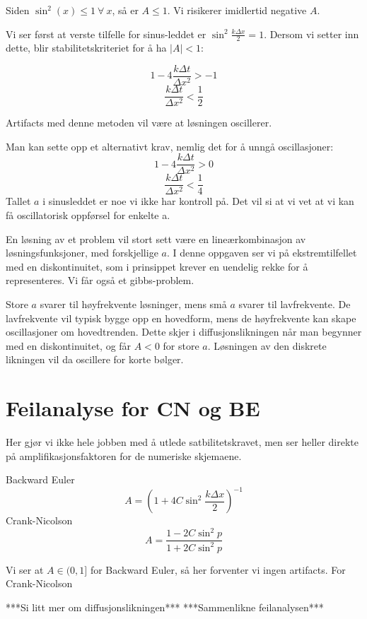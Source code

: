 \documentclass[a4paper, 10pt]{article}
\begin{document}
Siden $\sin^2(x) \leq 1 \ \forall \ x$, så er $A \leq 1$. Vi risikerer imidlertid negative $A$. 

Vi ser først at verste tilfelle for sinus-leddet er $\sin^2{\frac{k\Delta x}{2}} = 1$. Dersom vi setter inn dette, blir stabilitetskriteriet for å ha $|A| < 1$:

\begin{equation}
	1 - 4\frac{k\Delta t}{\Delta x^2} > -1
\end{equation}
\begin{equation}
	\frac{k\Delta t}{\Delta x^2} < \frac{1}{2}
\end{equation}

Artifacts med denne metoden vil være at løsningen oscillerer.

Man kan sette opp et alternativt krav, nemlig det for å unngå oscillasjoner: 
\begin{equation}
	1 - 4\frac{k \Delta t}{\Delta x^2} > 0 
\end{equation}
\begin{equation}
	\frac{k\Delta t}{\Delta x^2} < \frac{1}{4}
\end{equation}
Tallet $a$ i sinusleddet er noe vi ikke har kontroll på. Det vil si at vi vet at vi kan få oscillatorisk oppførsel for enkelte a. 

En løsning av et problem vil stort sett være en lineærkombinasjon av løsningsfunksjoner, med forskjellige $a$. I denne oppgaven ser vi på ekstremtilfellet med en diskontinuitet, som i prinsippet krever en uendelig rekke for å representeres. Vi får også et gibbs-problem. 

Store $a$ svarer til høyfrekvente løsninger, mens små $a$ svarer til lavfrekvente. De lavfrekvente vil typisk bygge opp en hovedform, mens de høyfrekvente kan skape oscillasjoner om hovedtrenden. Dette skjer i diffusjonslikningen når man begynner med en diskontinuitet, og får $A<0$ for store $a$. Løsningen av den diskrete likningen vil da oscillere for korte bølger.

\section{Feilanalyse for CN og BE}
Her gjør vi ikke hele jobben med å utlede satbilitetskravet, men ser heller direkte på amplifikasjonsfaktoren for de numeriske skjemaene. 

\begin{center}
Backward Euler
\begin{equation}
	A = (1  + 4C\sin^2{\frac{k\Delta x}{2}})^{-1}
\end{equation}
Crank-Nicolson
\begin{equation}
	A = \frac{ 1 - 2C\sin^2p}{1 + 2C\sin^2p}
\end{equation}
\end{center}

Vi ser at $A \in (0, 1]$ for Backward Euler, så her forventer vi ingen artifacts. For Crank-Nicolson 

***Si litt mer om diffusjonslikningen***
***Sammenlikne feilanalysen***
\end{document}
